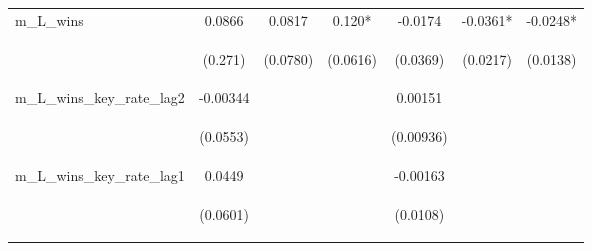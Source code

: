 \documentclass[]{article}
\begin{document}
\begin{center}
\begin{tabular}{lcccccc}
m\_L\_wins & 0.0866 & 0.0817 & 0.120* & -0.0174 & -0.0361* & -0.0248* \\
\vspace{4pt} & \begin{footnotesize}(0.271)\end{footnotesize} & \begin{footnotesize}(0.0780)\end{footnotesize} & \begin{footnotesize}(0.0616)\end{footnotesize} & \begin{footnotesize}(0.0369)\end{footnotesize} & \begin{footnotesize}(0.0217)\end{footnotesize} & \begin{footnotesize}(0.0138)\end{footnotesize} \\
m\_L\_wins\_key\_rate\_lag2 & -0.00344 &  &  & 0.00151 &  &  \\
\vspace{4pt} & \begin{footnotesize}(0.0553)\end{footnotesize} & \begin{footnotesize}\end{footnotesize} & \begin{footnotesize}\end{footnotesize} & \begin{footnotesize}(0.00936)\end{footnotesize} & \begin{footnotesize}\end{footnotesize} & \begin{footnotesize}\end{footnotesize} \\
m\_L\_wins\_key\_rate\_lag1 & 0.0449 &  &  & -0.00163 &  &  \\
\vspace{4pt} & \begin{footnotesize}(0.0601)\end{footnotesize} & \begin{footnotesize}\end{footnotesize} & \begin{footnotesize}\end{footnotesize} & \begin{footnotesize}(0.0108)\end{footnotesize} & \begin{footnotesize}\end{footnotesize} & \begin{footnotesize}\end{footnotesize} \\

\end{tabular}
\end{center}
\end{document}
